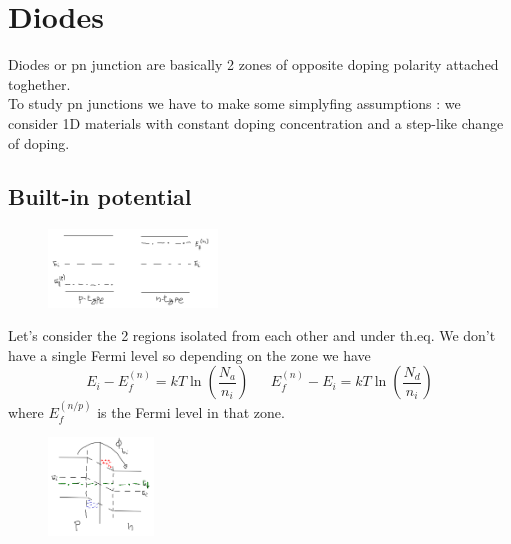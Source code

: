 \chapter{Diodes}
Diodes or pn junction are basically 2 zones of opposite doping polarity attached toghether.\\
To study pn junctions we have to make some simplyfing assumptions : we consider 1D materials with constant doping concentration and a step-like change of doping.\\
\section{Built-in potential}
\begin{figure}
\includegraphics[width=0.4\textwidth]{pn1.png}
\end{figure}


Let's consider the 2 regions isolated from each other and under th.eq. We don't have a single Fermi level so depending on the zone we have 
\begin{equation}
E_i-E_f^{(n)}=kT\ln(\frac{N_a}{n_i}) \ \ \ \ \ \ \ E_f^{(n)}-E_i=kT\ln(\frac{N_d}{n_i})
\end{equation}
where $E_f^{(n/p)}$ is the Fermi level in that zone.\\

\begin{figure}
\includegraphics[width=0.25\textwidth]{pn2.png}
\end{figure}

